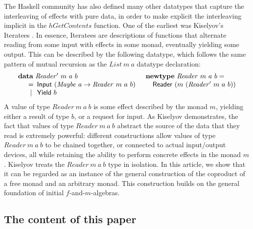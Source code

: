 \documentclass{jfp1}
\newcommand{\kw}[1]{\textbf{#1}}
\begin{document}
The Haskell community has also defined many other datatypes that
capture the interleaving of effects with pure data, in order to make
explicit the interleaving implicit in the $\mathit{hGetContents}$
function. One of the earliest was Kiselyov's Iteratees
\cite{kiselyov12iteratees}. In essence, Iteratees are descriptions of
functions that alternate reading from some input with effects in some
monad, eventually yielding some output. This can be described by the
following datatype, which follows the same pattern of mutual recursion
as the $\mathit{List}~m~a$ datatype declaration:
\begin{displaymath}
  \begin{array}{ll}
    \kw{data}~\mathit{Reader'}~m~a~b
    &
    \kw{newtype}~\mathit{Reader}~m~a~b = 
    \\
    \quad
    \begin{array}[t]{c@{\hspace{0.5em}}l}
      = & \mathsf{Input}~(\mathit{Maybe}~a \to \mathit{Reader}~m~a~b) \\
      | & \mathsf{Yield}~b
    \end{array}
    &
    \quad \mathsf{Reader}~(m~(\mathit{Reader'}~m~a~b))
  \end{array}
\end{displaymath}
A value of type $\mathit{Reader}~m~a~b$ is some effect described by
the monad $m$, yielding either a result of type $b$, or a request for
input. As Kiselyov demonstrates, the fact that values of type
$\mathit{Reader}~m~a~b$ abstract the source of the data that they read
is extremely powerful: different constructions allow values of type
$\mathit{Reader}~m~a~b$ to be chained together, or connected to actual
input/output devices, all while retaining the ability to perform
concrete effects in the monad $m$.  Kiselyov treats the
$\mathit{Reader}~m~a~b$ type in isolation. In this article, we show
that it can be regarded as an instance of the general construction of
the coproduct of a free monad and an arbitrary monad. This
construction builds on the general foundation of initial
$f$-and-$m$-algebras.

\subsection{The content of this paper}
\end{document}
